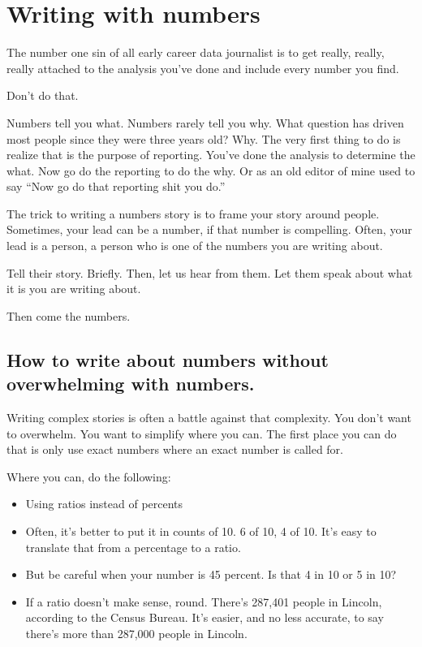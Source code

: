 \documentclass[
  letterpaper,
  DIV=11,
  numbers=noendperiod]{scrreprt}
\providecommand{\tightlist}{%
  \setlength{\itemsep}{0pt}\setlength{\parskip}{0pt}}\usepackage{longtable,booktabs,array}
\begin{document}

\hypertarget{writing-with-numbers}{%
\chapter{Writing with numbers}\label{writing-with-numbers}}

The number one sin of all early career data journalist is to get really,
really, really attached to the analysis you've done and include every
number you find.

Don't do that.

Numbers tell you what. Numbers rarely tell you why. What question has
driven most people since they were three years old? Why. The very first
thing to do is realize that is the purpose of reporting. You've done the
analysis to determine the what. Now go do the reporting to do the why.
Or as an old editor of mine used to say ``Now go do that reporting shit
you do.''

The trick to writing a numbers story is to frame your story around
people. Sometimes, your lead can be a number, if that number is
compelling. Often, your lead is a person, a person who is one of the
numbers you are writing about.

Tell their story. Briefly. Then, let us hear from them. Let them speak
about what it is you are writing about.

Then come the numbers.

\hypertarget{how-to-write-about-numbers-without-overwhelming-with-numbers.}{%
\section{How to write about numbers without overwhelming with
numbers.}\label{how-to-write-about-numbers-without-overwhelming-with-numbers.}}

Writing complex stories is often a battle against that complexity. You
don't want to overwhelm. You want to simplify where you can. The first
place you can do that is only use exact numbers where an exact number is
called for.

Where you can, do the following:

\begin{itemize}
\tightlist
\item
  Using ratios instead of percents
\item
  Often, it's better to put it in counts of 10. 6 of 10, 4 of 10. It's
  easy to translate that from a percentage to a ratio.
\item
  But be careful when your number is 45 percent. Is that 4 in 10 or 5 in
  10?
\item
  If a ratio doesn't make sense, round. There's 287,401 people in
  Lincoln, according to the Census Bureau. It's easier, and no less
  accurate, to say there's more than 287,000 people in Lincoln.
\end{itemize}
\end{document}
